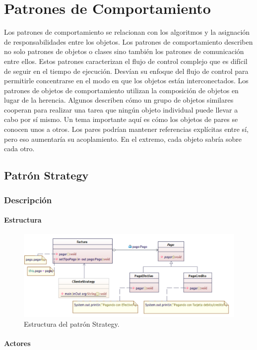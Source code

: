 \section{Patrones de Comportamiento}
Los patrones de comportamiento se relacionan con los algoritmos y la asignación de responsabilidades entre los objetos. Los patrones de comportamiento describen no solo patrones de objetos o clases sino también los patrones de comunicación entre ellos. Estos patrones caracterizan el flujo de control complejo que es difícil de seguir en el tiempo de ejecución. Desvían su enfoque del flujo de control para permitirle concentrarse en el modo en que los objetos están interconectados. Los patrones de objetos de comportamiento utilizan la composición de objetos en lugar de la herencia. Algunos describen cómo un grupo de objetos similares cooperan para realizar una tarea que ningún objeto individual puede llevar a cabo por sí mismo. Un tema importante aquí es cómo los objetos de pares se conocen unos a otros. Los pares podrían mantener referencias explícitas entre sí, pero eso aumentaría su acoplamiento. En el extremo, cada objeto sabría sobre cada otro.\cite{gof}
\subsection{Patrón Strategy}

\subsubsection{Descripción}

\paragraph{Estructura}

\begin{figure}[th!]
	\centering
	\includegraphics[width=.7\linewidth]{imagenes/Patrones/Strategy.pdf}
	\caption{Estructura del patrón Strategy.\cite{gof}}	
\end{figure}

\paragraph{Actores}

